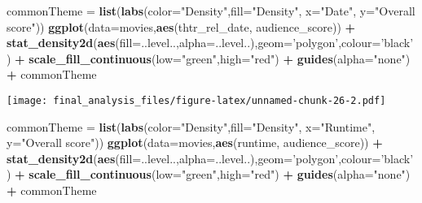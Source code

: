 \documentclass[]{article}
\newenvironment{Shaded}{\begin{snugshade}}{\end{snugshade}}
\newcommand{\DataTypeTok}[1]{\textcolor[rgb]{0.13,0.29,0.53}{#1}}
\newcommand{\KeywordTok}[1]{\textcolor[rgb]{0.13,0.29,0.53}{\textbf{#1}}}
\newcommand{\NormalTok}[1]{#1}
\newcommand{\OperatorTok}[1]{\textcolor[rgb]{0.81,0.36,0.00}{\textbf{#1}}}
\newcommand{\StringTok}[1]{\textcolor[rgb]{0.31,0.60,0.02}{#1}}
\begin{document}
\begin{Shaded}
\begin{Highlighting}[]
\NormalTok{commonTheme =}\StringTok{ }\KeywordTok{list}\NormalTok{(}\KeywordTok{labs}\NormalTok{(}\DataTypeTok{color=}\StringTok{"Density"}\NormalTok{,}\DataTypeTok{fill=}\StringTok{"Density"}\NormalTok{, }\DataTypeTok{x=}\StringTok{"Date"}\NormalTok{, }\DataTypeTok{y=}\StringTok{"Overall score"}\NormalTok{))}
\KeywordTok{ggplot}\NormalTok{(}\DataTypeTok{data=}\NormalTok{movies,}\KeywordTok{aes}\NormalTok{(thtr_rel_date, audience_score)) }\OperatorTok{+}\StringTok{ }
\StringTok{  }\KeywordTok{stat_density2d}\NormalTok{(}\KeywordTok{aes}\NormalTok{(}\DataTypeTok{fill=}\NormalTok{..level..,}\DataTypeTok{alpha=}\NormalTok{..level..),}\DataTypeTok{geom=}\StringTok{'polygon'}\NormalTok{,}\DataTypeTok{colour=}\StringTok{'black'}\NormalTok{) }\OperatorTok{+}\StringTok{ }
\StringTok{  }\KeywordTok{scale_fill_continuous}\NormalTok{(}\DataTypeTok{low=}\StringTok{"green"}\NormalTok{,}\DataTypeTok{high=}\StringTok{"red"}\NormalTok{) }\OperatorTok{+}
\StringTok{  }\KeywordTok{guides}\NormalTok{(}\DataTypeTok{alpha=}\StringTok{"none"}\NormalTok{) }\OperatorTok{+}
\StringTok{  }\NormalTok{commonTheme}
\end{Highlighting}
\end{Shaded}

\texttt{[image: final\_analysis\_files/figure-latex/unnamed-chunk-26-2.pdf]}

\begin{Shaded}
\begin{Highlighting}[]
\NormalTok{commonTheme =}\StringTok{ }\KeywordTok{list}\NormalTok{(}\KeywordTok{labs}\NormalTok{(}\DataTypeTok{color=}\StringTok{"Density"}\NormalTok{,}\DataTypeTok{fill=}\StringTok{"Density"}\NormalTok{, }\DataTypeTok{x=}\StringTok{"Runtime"}\NormalTok{, }\DataTypeTok{y=}\StringTok{"Overall score"}\NormalTok{))}
\KeywordTok{ggplot}\NormalTok{(}\DataTypeTok{data=}\NormalTok{movies,}\KeywordTok{aes}\NormalTok{(runtime, audience_score)) }\OperatorTok{+}\StringTok{ }
\StringTok{  }\KeywordTok{stat_density2d}\NormalTok{(}\KeywordTok{aes}\NormalTok{(}\DataTypeTok{fill=}\NormalTok{..level..,}\DataTypeTok{alpha=}\NormalTok{..level..),}\DataTypeTok{geom=}\StringTok{'polygon'}\NormalTok{,}\DataTypeTok{colour=}\StringTok{'black'}\NormalTok{) }\OperatorTok{+}\StringTok{ }
\StringTok{  }\KeywordTok{scale_fill_continuous}\NormalTok{(}\DataTypeTok{low=}\StringTok{"green"}\NormalTok{,}\DataTypeTok{high=}\StringTok{"red"}\NormalTok{) }\OperatorTok{+}
\StringTok{  }\KeywordTok{guides}\NormalTok{(}\DataTypeTok{alpha=}\StringTok{"none"}\NormalTok{) }\OperatorTok{+}
\StringTok{   }\NormalTok{commonTheme}
\end{Highlighting}
\end{Shaded}
\end{document}
